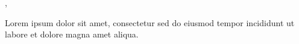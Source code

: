 \documentclass{book}
\begin{document}
, 

\beginnumbering
\autopar

Lorem ipsum dolor sit amet, consectetur sed do eiusmod tempor incididunt ut labore et dolore magna amet aliqua.

\endnumbering
\end{document}
